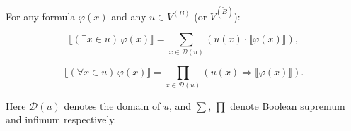 For any formula $\varphi(x)$ and any $u \in V^{(B)}$ (or $V^{(\tilde{B})}$):

$$\llbracket (\exists x \in u)\,\varphi(x) \rrbracket = \sum_{x \in \mathcal{D}(u)} (u(x) \cdot \llbracket \varphi(x) \rrbracket),$$

$$\llbracket (\forall x \in u)\,\varphi(x) \rrbracket = \prod_{x \in \mathcal{D}(u)} (u(x) \Rightarrow \llbracket \varphi(x) \rrbracket).$$

Here $\mathcal{D}(u)$ denotes the domain of $u$, and $\sum$, $\prod$ denote Boolean supremum and infimum respectively.

